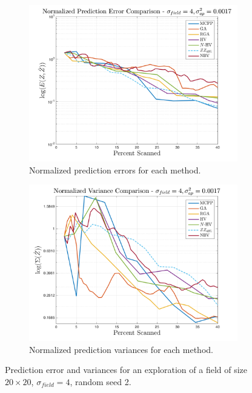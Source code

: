 \begin{figure}[htb!]
    \centering
    \begin{subfigure}[t]{0.5\textwidth}
        \centering
        \includegraphics[width=\linewidth]{figures/results/normalized_errors_40p_20x20_sf_4_seed_2_app_10.png}
        \ssp
        \captionsetup{skip=0.20\baselineskip,size=footnotesize}
        \caption{Normalized prediction errors for each method.}
    \end{subfigure}%
    \begin{subfigure}[t]{0.5\textwidth}
        \centering
        \includegraphics[width=\linewidth]{figures/results/normalized_variances_40p_20x20_sf_4_seed_2_app_10.png}
        \ssp
        \captionsetup{skip=0.20\baselineskip,size=footnotesize}
        \caption{Normalized prediction variances for each method.}
    \end{subfigure}%
    \ssp
    \captionsetup{skip=0.20\baselineskip}
    \caption{Prediction error and variances for an exploration of a field of size $20 \times 20$, $\sigma_{field} = 4$, random seed 2.}
    \label{fig:nbvcomp}
\end{figure}

